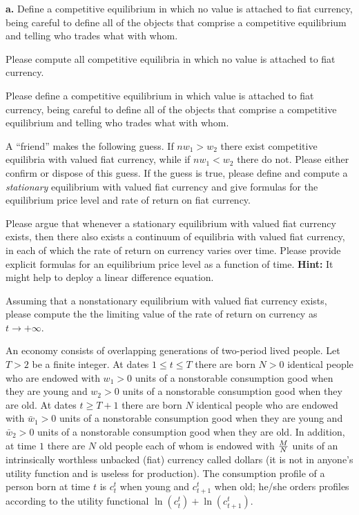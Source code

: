 \medskip
\noindent 
{\bf a.} Define a competitive equilibrium in which no value is attached to fiat currency, being careful to define all
of the objects that comprise a competitive equilibrium and telling who trades what with whom.

\medskip
{} Please compute all competitive equilibria in which no value is attached to fiat currency.

\medskip
{} Please define a competitive equilibrium in which value is attached to fiat currency, 
being careful to define all
of the objects that comprise a competitive equilibrium and telling who trades what with whom.

\medskip
{} A ``friend'' makes the following guess.  If $n w_1 > w_2$ there exist competitive equilibria
with valued fiat currency, while if $n w_1 < w_2$ there do not.  Please either confirm or dispose of this guess.
If the guess is true, please define and compute a {\it stationary\/} equilibrium with valued fiat currency and give formulas
for the equilibrium price level and rate of return on fiat currency.

\medskip
{} Please argue that whenever a stationary equilibrium with valued fiat currency exists, then there
also exists a continuum of equilibria with valued fiat currency, in each of which the rate of return on currency
varies over time.  Please provide explicit formulas for an equilibrium  price level as a function of time.  
{\bf Hint:} It might help to deploy a linear difference equation.

\medskip
{} Assuming that a nonstationary equilibrium with valued fiat currency exists, please compute the
the limiting value of the rate of return on currency as $t \rightarrow + \infty$. 


\medskip

 An economy consists of overlapping generations of two-period lived people.  Let $T > 2$ be a finite 
integer. At dates $ 1 \leq t \leq T$ there are born
$N >0 $ identical people who are endowed with $w_1 >0$ units of a nonstorable consumption good when they
are young and $w_2>0 $ units of a nonstorable consumption good when they are old.  
At dates $t \geq T+1$ there are born
$N$ identical people who are endowed with $\bar w_1 >0$ units of a nonstorable consumption good when they
are young and $\bar w_2>0$ units of a nonstorable consumption good when they are old. In addition, at time $1$ there
are $N$ old people each of whom is endowed with ${M \over N}$ units of an intrinsically worthless unbacked (fiat) currency called
dollars (it is not in anyone's utility function and is useless for production). The consumption profile
of a person born at time $t$ is $c_t^t$ when young and $c_{t+1}^t$ when old; he/she orders profiles according to the
utility functional
$ \ln (c_t^t) + \ln (c^t_{t+1}) .$



